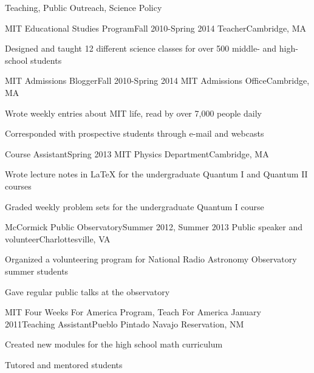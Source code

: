 \documentclass{resume} %
\begin{document}
\begin{rSection}{Teaching, Public Outreach, Science Policy}
  \begin{rSubsection}{MIT Educational Studies Program}{Fall 2010-Spring 2014}
    {Teacher}{Cambridge, MA}
  \item Designed and taught 12 different science classes for over 500 middle-
    and high-school students
  \end{rSubsection}

  \begin{rSubsection}{MIT Admissions Blogger}{Fall 2010-Spring 2014}
    {MIT Admissions Office}{Cambridge, MA}
  \item Wrote weekly entries about MIT life, read by over 7,000 people daily
  \item Corresponded with prospective students through e-mail and webcasts
  \end{rSubsection}

  \begin{rSubsection}{Course Assistant}{Spring 2013}
    {MIT Physics Department}{Cambridge, MA}
  \item Wrote lecture notes in LaTeX for the undergraduate Quantum I
    and Quantum II courses
  \item Graded weekly problem sets for the undergraduate Quantum I course
  \end{rSubsection}

  \begin{rSubsection}{McCormick Public Observatory}{Summer 2012, Summer 2013}
    {Public speaker and volunteer}{Charlottesville, VA}
  \item Organized a volunteering program for National Radio Astronomy Observatory 
    summer students
  \item Gave regular public talks at the observatory
  \end{rSubsection}

  \begin{rSubsection}{MIT Four Weeks For America Program, Teach For America}
    {January 2011}{Teaching Assistant}{Pueblo Pintado Navajo Reservation, NM}
  \item Created new modules for the high school math curriculum
  \item Tutored and mentored students
  \end{rSubsection}

\end{rSection}

\end{document}
